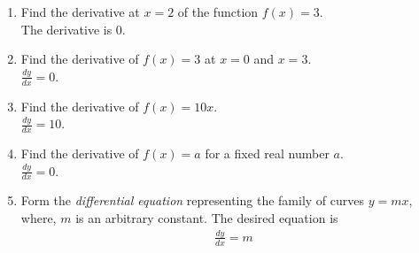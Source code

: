 \begin{enumerate}[label=\arabic*.,ref=\thesubsection.\theenumi]
%
\item Find the derivative at $x = 2$ of the function $f(x) = 3$.
\\
\solution The derivative is 0.
\item Find the derivative of $f(x) = 3$ at $x = 0$ and $x = 3$.
\\
\solution $\frac{dy}{dx}=0$.
\item Find the derivative of $f(x) = 10x$.
\\
\solution $\frac{dy}{dx}=10$.
\item Find the derivative of $f(x) =a$ for a fixed real number $a$.
%
\\
\solution $\frac{dy}{dx}=0$.
\item Form the {\em differential equation} representing the family of curves $y = mx$, where, $m$ is an arbitrary constant.
\solution The desired equation is 
%
\begin{align}
\frac{dy}{dx} = m
\end{align}
%

\end{enumerate}
